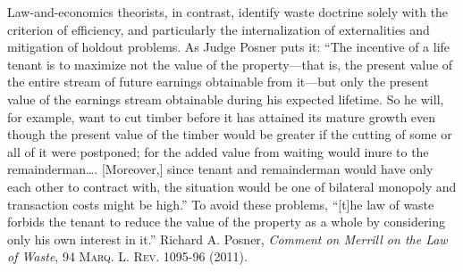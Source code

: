 \item Law-and-economics theorists, in contrast, identify waste doctrine solely
with the criterion of efficiency, and particularly the internalization of
externalities and mitigation of holdout problems. As Judge Posner puts it:
``The incentive of a life tenant is to maximize not the value of the
property---that is, the present value of the entire stream of future earnings
obtainable from it---but only the present value of the earnings stream
obtainable during his expected lifetime. So he will, for example, want to cut
timber before it has attained its mature growth even though the present value
of the timber would be greater if the cutting of some or all of it were
postponed; for the added value from waiting would inure to the
remainderman\dots. [Moreover,] since tenant and remainderman would have only
each other to contract with, the situation would be one of bilateral monopoly
and transaction costs might be high.'' To avoid these problems, ``[t]he law of
waste forbids the tenant to reduce the value of the property as a whole by
considering only his own interest in it.'' Richard A. Posner, \textit{Comment
on Merrill on the Law of Waste}, 94 \textsc{Marq. L. Rev}. 1095-96 (2011).

